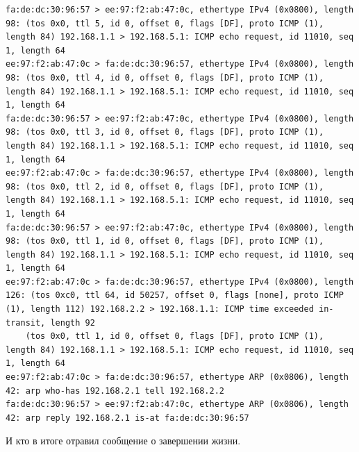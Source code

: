 \documentclass[a4paper,12pt]{article}
\begin{document}
\begin{Verbatim}
fa:de:dc:30:96:57 > ee:97:f2:ab:47:0c, ethertype IPv4 (0x0800), length 98: (tos 0x0, ttl 5, id 0, offset 0, flags [DF], proto ICMP (1), length 84) 192.168.1.1 > 192.168.5.1: ICMP echo request, id 11010, seq 1, length 64
ee:97:f2:ab:47:0c > fa:de:dc:30:96:57, ethertype IPv4 (0x0800), length 98: (tos 0x0, ttl 4, id 0, offset 0, flags [DF], proto ICMP (1), length 84) 192.168.1.1 > 192.168.5.1: ICMP echo request, id 11010, seq 1, length 64
fa:de:dc:30:96:57 > ee:97:f2:ab:47:0c, ethertype IPv4 (0x0800), length 98: (tos 0x0, ttl 3, id 0, offset 0, flags [DF], proto ICMP (1), length 84) 192.168.1.1 > 192.168.5.1: ICMP echo request, id 11010, seq 1, length 64
ee:97:f2:ab:47:0c > fa:de:dc:30:96:57, ethertype IPv4 (0x0800), length 98: (tos 0x0, ttl 2, id 0, offset 0, flags [DF], proto ICMP (1), length 84) 192.168.1.1 > 192.168.5.1: ICMP echo request, id 11010, seq 1, length 64
fa:de:dc:30:96:57 > ee:97:f2:ab:47:0c, ethertype IPv4 (0x0800), length 98: (tos 0x0, ttl 1, id 0, offset 0, flags [DF], proto ICMP (1), length 84) 192.168.1.1 > 192.168.5.1: ICMP echo request, id 11010, seq 1, length 64
ee:97:f2:ab:47:0c > fa:de:dc:30:96:57, ethertype IPv4 (0x0800), length 126: (tos 0xc0, ttl 64, id 50257, offset 0, flags [none], proto ICMP (1), length 112) 192.168.2.2 > 192.168.1.1: ICMP time exceeded in-transit, length 92
	(tos 0x0, ttl 1, id 0, offset 0, flags [DF], proto ICMP (1), length 84) 192.168.1.1 > 192.168.5.1: ICMP echo request, id 11010, seq 1, length 64
ee:97:f2:ab:47:0c > fa:de:dc:30:96:57, ethertype ARP (0x0806), length 42: arp who-has 192.168.2.1 tell 192.168.2.2
fa:de:dc:30:96:57 > ee:97:f2:ab:47:0c, ethertype ARP (0x0806), length 42: arp reply 192.168.2.1 is-at fa:de:dc:30:96:57
\end{Verbatim}

И кто в итоге отравил сообщение о завершении жизни.
\end{document}

